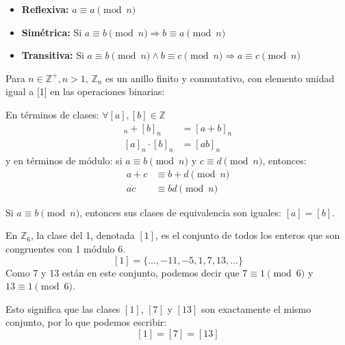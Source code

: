 \documentclass[12pt]{article}
\begin{document}
\begin{tcolorbox}[title=Relación de equivalencia]
\begin{itemize}
    \item \textbf{Reflexiva:} \( a \equiv a \pmod{n} \)
    \item \textbf{Simétrica:} Si \( a \equiv b \pmod{n} \Rightarrow b \equiv a \pmod{n} \)
    \item \textbf{Transitiva:} Si \( a \equiv b \pmod{n} \land b \equiv c \pmod{n} \Rightarrow a \equiv c \pmod{n} \)
\end{itemize}
\end{tcolorbox}

\begin{tcolorbox}[title=Anillo de enteros \( \pmod{n} \)]
Para \( n \in \mathbb{Z}^+, n > 1 \), \( \mathbb{Z}_n \) es un anillo finito y conmutativo, con elemento unidad igual a [1] en las operaciones binarias:

\bigskip

En términos de clases: \( \forall [a], [b] \in \mathbb{Z} \)
\begin{align*}
    [a]_n + [b]_n &= [a + b]_n \\
    [a]_n \cdot [b]_n &= [a b]_n
\end{align*}
y en términos de módulo: si \( a \equiv b \pmod{n} \) y \( c \equiv d \pmod{n} \), entonces:
\begin{align*}
    a + c &\equiv b + d \pmod{n} \\
    ac &\equiv bd \pmod{n}   
\end{align*}
\end{tcolorbox}

\begin{tcolorbox}[colback=yellow!15, title=Nota]

Si \( a \equiv b \pmod{n} \), entonces sus clases de equivalencia son iguales: \( [a] = [b] \).
\end{tcolorbox}

\begin{tcolorbox}[title=Ejemplo de clases de equivalencia]
En \( \mathbb{Z}_6 \), la clase del 1, denotada \( [1] \), es el conjunto de todos los enteros que son congruentes con 1 módulo 6.
\[ [1] = \{ \dots, -11, -5, 1, 7, 13, \dots \} \]
Como 7 y 13 están en este conjunto, podemos decir que \( 7 \equiv 1 \pmod{6} \) y \( 13 \equiv 1 \pmod{6} \).

\bigskip

Esto significa que las clases \( [1] \), \( [7] \) y \( [13] \) son exactamente el mismo conjunto, por lo que podemos escribir:
\[ [1] = [7] = [13] \]
\end{tcolorbox}
\end{document}
